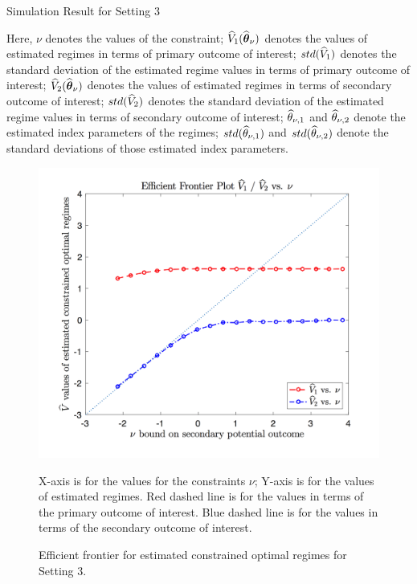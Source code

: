 \begin{table}[!htbp]
	\caption {Simulation Result for Setting 3}
	\centering
	{\tt
		
	}
	\justify
	Here, $\nu$ denotes the values of the constraint; $\widehat{V}_1(\widehat{\boldsymbol{\theta}}_{\nu})$ denotes the values of estimated regimes in terms of primary outcome of interest; $std(\widehat{V}_1)$ denotes the standard deviation of the estimated regime values in terms of primary outcome of interest; $\widehat{V}_2(\widehat{\boldsymbol{\theta}}_{\nu})$ denotes the values of estimated regimes in terms of secondary outcome of interest; $std(\widehat{V}_2)$ denotes the standard deviation of the estimated regime values in terms of secondary outcome of interest; $\widehat{\theta}_{\nu,1}$ and $\widehat{\theta}_{\nu,2}$ denote the estimated index parameters of the regimes; $std(\widehat{\theta}_{\nu,1})$ and $std(\widehat{\theta}_{\nu,2})$ denote the standard deviations of those estimated index parameters.	
\end{table} 
\begin{figure}[!htb]
	\centering
	\includegraphics[width=.9\linewidth]{./Chapter-1/figs/efficient_plot3.png}
	\caption{Efficient frontier for estimated constrained optimal regimes for Setting 3.}
	\label{fig:3}
	\justify
X-axis is for the values for the constraints $\nu$; Y-axis is for the values of estimated regimes. Red dashed line is for the values in terms of the primary outcome of interest. Blue dashed line is for the values in terms of the secondary outcome of interest.
\end{figure}
